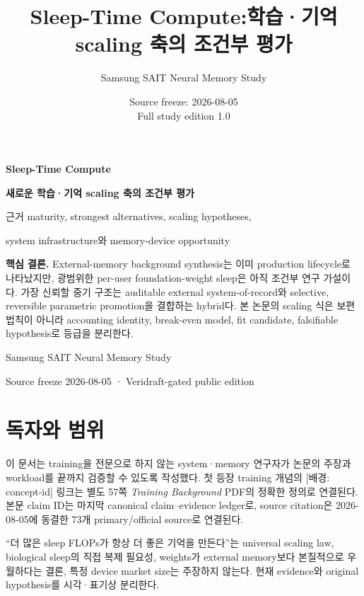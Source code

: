 \documentclass[11pt,a4paper,oneside,openany]{book}
\title{Sleep-Time Compute:\새로운 학습·기억 scaling 축의 조건부 평가}
\author{Samsung SAIT Neural Memory Study}
\date{Source freeze: 2026-08-05\\Full study edition 1.0}
\begin{document}
\hypersetup{pageanchor=false}
\begin{titlepage}
  \centering
  \vspace*{18mm}
  {\sffamily\bfseries\color{STCNavy}\fontsize{27}{33}\selectfont
   Sleep-Time Compute\par}
  \vspace{3mm}
  {\sffamily\bfseries\color{STCBlue}\fontsize{20}{26}\selectfont
   새로운 학습·기억 scaling 축의 조건부 평가\par}
  \vspace{7mm}
  {\large 근거 maturity, strongest alternatives, scaling hypotheses,\par
   system infrastructure와 memory-device opportunity\par}
  \vspace{15mm}
  \begin{tcolorbox}[width=0.86\textwidth,colback=STCMist,colframe=STCBlue,boxrule=0.8pt,arc=2mm]
  \textbf{핵심 결론.} External-memory background synthesis는 이미 production lifecycle로 나타났지만,
  광범위한 per-user foundation-weight sleep은 아직 조건부 연구 가설이다. 가장 신뢰할 중기 구조는
  auditable external system-of-record와 selective, reversible parametric promotion을 결합하는 hybrid다.
  본 논문의 scaling 식은 보편 법칙이 아니라 accounting identity, break-even model, fit candidate,
  falsifiable hypothesis로 등급을 분리한다.
  \end{tcolorbox}
  \vfill
  {\sffamily Samsung SAIT Neural Memory Study\par}
  {\small Source freeze 2026-08-05 · Veridraft-gated public edition\par}
\end{titlepage}
\hypersetup{pageanchor=true}
\frontmatter

\chapter*{독자와 범위}
이 문서는 training을 전문으로 하지 않는 system·memory 연구자가 논문의 주장과 workload를 끝까지
검증할 수 있도록 작성했다. 첫 등장 training 개념의 \textsf{[배경: concept-id]} 링크는 별도 57쪽
\emph{Training Background} PDF의 정확한 정의로 연결된다. 본문 claim ID는 마지막 canonical
claim--evidence ledger로, source citation은 2026-08-05에 동결한 73개 primary/official source로 연결된다.

\begin{keypoint}
``더 많은 sleep FLOPs가 항상 더 좋은 기억을 만든다''는 universal scaling law, biological sleep의
직접 복제 필요성, weights가 external memory보다 본질적으로 우월하다는 결론, 특정 device market size는
주장하지 않는다. 현재 evidence와 original hypothesis를 시각·표기상 분리한다.
\end{keypoint}
\end{document}
